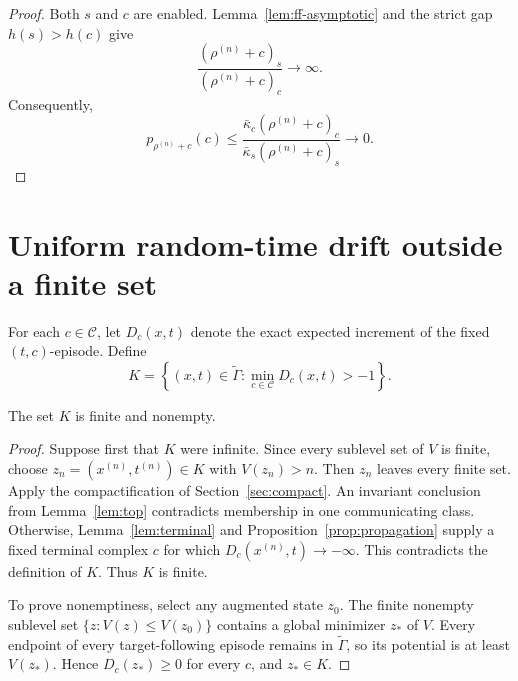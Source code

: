 \begin{proof}
Both \(s\) and \(c\) are enabled.  Lemma~\ref{lem:ff-asymptotic} and the
strict gap \(h(s)>h(c)\) give
\[
  \frac{(\rho^{(n)}+c)_s}{(\rho^{(n)}+c)_c}\longrightarrow\infty.
\]
Consequently,
\[
 p_{\rho^{(n)}+c}(c)
 \le
 \frac{\bar\kappa_c(\rho^{(n)}+c)_c}
      {\bar\kappa_s(\rho^{(n)}+c)_s}
 \longrightarrow0.
\]
\end{proof}

\section{Uniform random-time drift outside a finite set}\label{sec:uniform}

For each \(c\in\mathcal C\), let \(D_c(x,t)\) denote the exact expected
increment of the fixed \((t,c)\)-episode.  Define
\begin{equation}\label{eq:K}
 K=\left\{(x,t)\in\widetilde\Gamma:
          \min_{c\in\mathcal C}D_c(x,t)>-1\right\}.
\end{equation}

\begin{proposition}\label{prop:K}
The set \(K\) is finite and nonempty.
\end{proposition}

\begin{proof}
Suppose first that \(K\) were infinite.  Since every sublevel set of \(V\) is
finite, choose \(z_n=(x^{(n)},t^{(n)})\in K\) with \(V(z_n)>n\).  Then
\(z_n\) leaves every finite set.  Apply the compactification of
Section~\ref{sec:compact}.  An invariant conclusion from
Lemma~\ref{lem:top} contradicts membership in one communicating class.
Otherwise, Lemma~\ref{lem:terminal} and
Proposition~\ref{prop:propagation} supply a fixed terminal complex \(c\) for
which \(D_c(x^{(n)},t)\to-\infty\).  This contradicts the definition of
\(K\).  Thus \(K\) is finite.

To prove nonemptiness, select any augmented state \(z_0\).  The finite
nonempty sublevel set \(\{z:V(z)\le V(z_0)\}\) contains a global minimizer
\(z_*\) of \(V\).  Every endpoint of every target-following episode remains
in \(\widetilde\Gamma\), so its potential is at least \(V(z_*)\).  Hence
\(D_c(z_*)\ge0\) for every \(c\), and \(z_*\in K\).
\end{proof}

